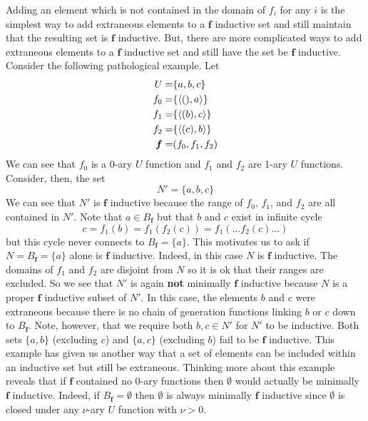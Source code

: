 \documentclass[oneside, 12pt]{book}
\theoremstyle{break}
\newtheorem{preformal definition}[definition]{Preformal Definition}
\newtheorem{preformal theorem}[theorem]{Preformal Theorem}
\newcommand{\bv}[1]{\boldsymbol{#1}}
\begin{document}
				Adding an element which is not contained in the domain of $f_i$ for any $i$ is the simplest way to add extraneous elements to a $\bv{f}$ inductive set and still maintain that the resulting set is $\bv{f}$ inductive. 
				But, there are more complicated ways to add extraneous elements to a $\bv{f}$ inductive set and still have the set be $\bv{f}$ inductive.			
				Consider the following pathological example.
				Let
				\begin{align*}
					U =& \{a, b, c\}\\
					f_0 =& \{\braket{(), a}\}\\
					f_1 =& \{\braket{(b), c}\}\\
					f_2 =& \{\braket{(c), b}\}\\
					\bv{f} =& (f_0, f_1, f_2)
				\end{align*}
				We can see that $f_0$ is a 0-ary $U$ function and $f_1$ and $f_2$ are 1-ary $U$ functions.				
				Consider, then, the set
				\begin{equation*}
					N' = \{a, b, c\}
				\end{equation*}
				We can see that $N'$ is $\bv{f}$ inductive because the range of $f_0$, $f_1$, and $f_2$ are all contained in $N'$.
				Note that $a\in B_{\bv{f}}$ but that $b$ and $c$ exist in infinite cycle
				\begin{equation*}
					c = f_1(b) = f_1(f_2(c)) = f_1(\ldots f_2(c)\ldots)
				\end{equation*}
				but this cycle never connects to $B_{\bv{f}} = \{a\}$.
				This motivates us to ask if $N=B_{\bv{f}} = \{a\}$ alone is $\bv{f}$ inductive.
				Indeed, in this case $N$ is $\bv{f}$ inductive.
				The domains of $f_1$ and $f_2$ are disjoint from $N$ so it is ok that their ranges are excluded.
				So we see that $N'$ is again \textbf{not} minimally $\bv{f}$ inductive because $N$ is a proper $\bv{f}$ inductive subset of $N'$.
				In this case, the elements $b$ and $c$ were extraneous because there is no chain of generation functions linking $b$ or $c$ down to $B_{\bv{f}}$.
				Note, however, that we require both $b, c \in N'$ for $N'$ to be inductive. 
				Both sets $\{a, b\}$ (excluding $c$) and $\{a, c\}$ (excluding $b$) fail to be $\bv{f}$ inductive.
				This example has given us another way that a set of elements can be included within an inductive set but still be extraneous.
				Thinking more about this example reveals that if $\bv{f}$ contained no 0-ary functions then $\emptyset$ would actually be minimally $\bv{f}$ inductive.
				Indeed, if $B_{\bv{f}} = \emptyset$ then $\emptyset$ is always minimally $\bv{f}$ inductive since $\emptyset$ is closed under any $\nu$-ary $U$ function with $\nu>0$.
				
\end{document}
